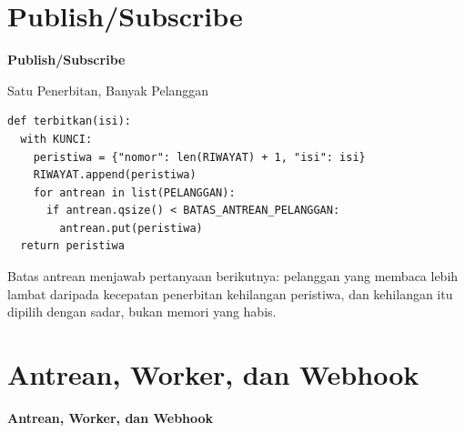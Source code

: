\documentclass[aspectratio=169, table, 12pt]{beamer}
\begin{document}
\section{Publish/Subscribe}

\begin{frame}{\hfill}
  \centering
  \Huge{\textbf{Publish/Subscribe}}
\end{frame}

\begin{frame}[fragile]{{\Large Satu Penerbitan, Banyak Pelanggan}}
  \vspace{2pt}
\begin{lstlisting}[style=PythonStyle]
def terbitkan(isi):
  with KUNCI:
    peristiwa = {"nomor": len(RIWAYAT) + 1, "isi": isi}
    RIWAYAT.append(peristiwa)
    for antrean in list(PELANGGAN):
      if antrean.qsize() < BATAS_ANTREAN_PELANGGAN:
        antrean.put(peristiwa)
  return peristiwa
\end{lstlisting}
  \vspace{2pt}
  {\small Batas antrean menjawab pertanyaan berikutnya: pelanggan yang
  membaca lebih lambat daripada kecepatan penerbitan kehilangan peristiwa,
  dan kehilangan itu dipilih dengan sadar, bukan memori yang habis.}
\end{frame}

\section{Antrean, Worker, dan Webhook}

\begin{frame}{\hfill}
  \centering
  \Huge{\textbf{Antrean, Worker, dan Webhook}}
\end{frame}
\end{document}
